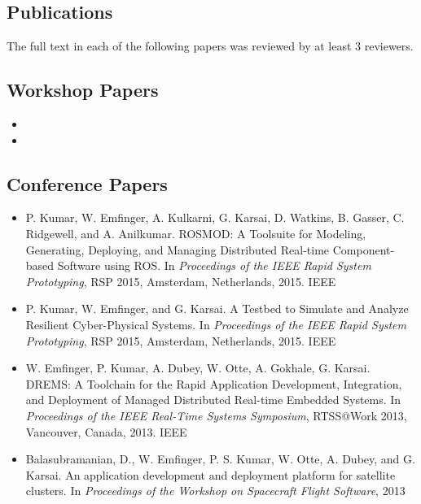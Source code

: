 \begin{appendices}

\chapter{Publications}

\label{ch:publications}

The full text in each of the following papers was reviewed by at least 3 reviewers.

\section{Workshop Papers}
\nobibliography*{}
\begin{itemize}
	\item {}
	\item {}
\end{itemize}

\section{Conference Papers}
\begin{itemize}
	
	\item P. Kumar, W. Emfinger, A. Kulkarni, G. Karsai, D. Watkins, B. Gasser, C. Ridgewell, and A. Anilkumar. ROSMOD: A Toolsuite for Modeling, Generating, Deploying, and Managing Distributed Real-time Component-based Software using ROS. In \textit{Proceedings of the IEEE Rapid System Prototyping}, RSP 2015, Amsterdam, Netherlands, 2015. IEEE	
	
	\item P. Kumar, W. Emfinger, and G. Karsai. A Testbed to Simulate and Analyze Resilient Cyber-Physical Systems. In \textit{Proceedings of the IEEE Rapid System Prototyping}, RSP 2015, Amsterdam, Netherlands, 2015. IEEE	
	
	\item W. Emfinger, P. Kumar, A. Dubey, W. Otte, A. Gokhale, G. Karsai. DREMS: A Toolchain for the Rapid Application Development, Integration, and Deployment of Managed Distributed Real-time Embedded Systems. In \textit{Proceedings of the IEEE Real-Time Systems Symposium}, RTSS@Work 2013, Vancouver, Canada, 2013. IEEE
	
	\item Balasubramanian, D., W. Emfinger, P. S. Kumar, W. Otte, A. Dubey, and G. Karsai. An application development and deployment platform for satellite clusters.  In \textit { Proceedings of the Workshop on Spacecraft Flight Software}, 2013
	

\end{itemize}
\end{appendices}
